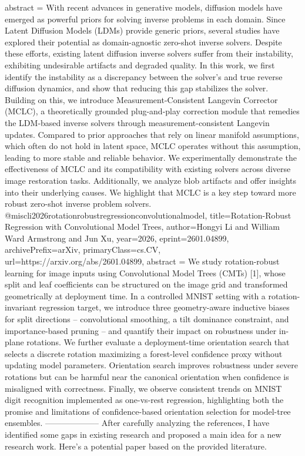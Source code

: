 {      abstract = {With recent advances in generative models, diffusion models have emerged as powerful priors for solving inverse problems in each domain. Since Latent Diffusion Models (LDMs) provide generic priors, several studies have explored their potential as domain-agnostic zero-shot inverse solvers. Despite these efforts, existing latent diffusion inverse solvers suffer from their instability, exhibiting undesirable artifacts and degraded quality. In this work, we first identify the instability as a discrepancy between the solver's and true reverse diffusion dynamics, and show that reducing this gap stabilizes the solver. Building on this, we introduce Measurement-Consistent Langevin Corrector (MCLC), a theoretically grounded plug-and-play correction module that remedies the LDM-based inverse solvers through measurement-consistent Langevin updates. Compared to prior approaches that rely on linear manifold assumptions, which often do not hold in latent space, MCLC operates without this assumption, leading to more stable and reliable behavior. We experimentally demonstrate the effectiveness of MCLC and its compatibility with existing solvers across diverse image restoration tasks. Additionally, we analyze blob artifacts and offer insights into their underlying causes. We highlight that MCLC is a key step toward more robust zero-shot inverse problem solvers.}
}@misc{li2026rotationrobustregressionconvolutionalmodel,
      title={Rotation-Robust Regression with Convolutional Model Trees}, 
      author={Hongyi Li and William Ward Armstrong and Jun Xu},
      year={2026},
      eprint={2601.04899},
      archivePrefix={arXiv},
      primaryClass={cs.CV},
      url={https://arxiv.org/abs/2601.04899},
      abstract = {We study rotation-robust learning for image inputs using Convolutional Model Trees (CMTs) [1], whose split and leaf coefficients can be structured on the image grid and transformed geometrically at deployment time. In a controlled MNIST setting with a rotation-invariant regression target, we introduce three geometry-aware inductive biases for split directions -- convolutional smoothing, a tilt dominance constraint, and importance-based pruning -- and quantify their impact on robustness under in-plane rotations. We further evaluate a deployment-time orientation search that selects a discrete rotation maximizing a forest-level confidence proxy without updating model parameters. Orientation search improves robustness under severe rotations but can be harmful near the canonical orientation when confidence is misaligned with correctness. Finally, we observe consistent trends on MNIST digit recognition implemented as one-vs-rest regression, highlighting both the promise and limitations of confidence-based orientation selection for model-tree ensembles.}
}
        --------------------
         After carefully analyzing the references, I have identified some gaps in existing research and proposed a main idea for a new research work. Here's a potential paper based on the provided literature.


